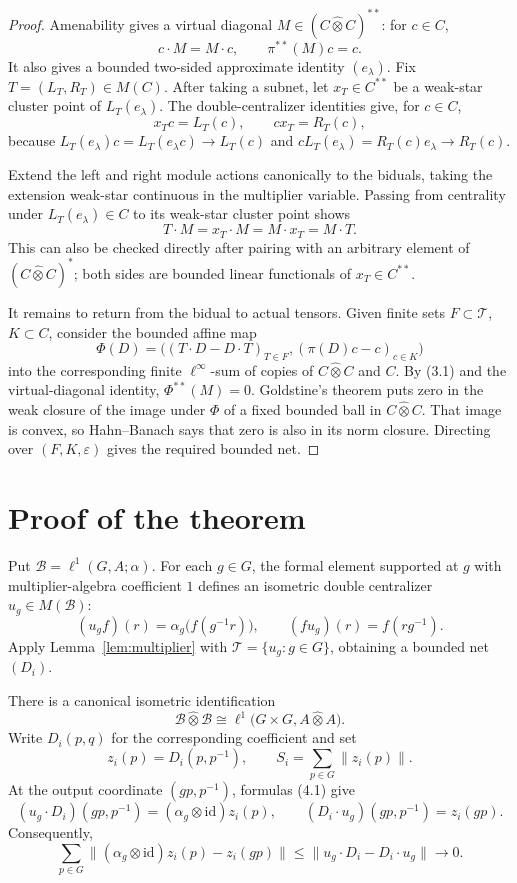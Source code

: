 \documentclass[11pt]{article}
\newcommand{\whot}{\widehat{\otimes}}
\newcommand{\ellone}{\ell^{1}}
\newcommand{\B}{\mathcal B}
\newcommand{\id}{\mathrm{id}}
\begin{document}
\begin{proof}
Amenability gives a virtual diagonal
\(M\in(C\whot C)^{**}\): for \(c\in C\),
\[
 c\cdot M=M\cdot c,
 \qquad \pi^{**}(M)c=c.
\]
It also gives a bounded two-sided approximate identity \((e_\lambda)\).
Fix \(T=(L_T,R_T)\in M(C)\).  After taking a subnet, let
\(x_T\in C^{**}\) be a weak-star cluster point of \(L_T(e_\lambda)\).
The double-centralizer identities give, for \(c\in C\),
\[
 x_Tc=L_T(c),
 \qquad cx_T=R_T(c),
\]
because
\(L_T(e_\lambda)c=L_T(e_\lambda c)\to L_T(c)\) and
\(cL_T(e_\lambda)=R_T(c)e_\lambda\to R_T(c)\).

Extend the left and right module actions canonically to the biduals, taking
the extension weak-star continuous in the multiplier variable.  Passing
from centrality under \(L_T(e_\lambda)\in C\) to its weak-star cluster
point shows
\[
 T\cdot M=x_T\cdot M=M\cdot x_T=M\cdot T.                 \tag{3.1}
\]
This can also be checked directly after pairing with an arbitrary element
of \((C\whot C)^*\); both sides are bounded linear functionals of
\(x_T\in C^{**}\).

It remains to return from the bidual to actual tensors.  Given finite sets
\(F\subset\mathcal T\), \(K\subset C\), consider the bounded affine map
\[
 \Phi(D)=\bigl((T\cdot D-D\cdot T)_{T\in F},
                  (\pi(D)c-c)_{c\in K}\bigr)
\]
into the corresponding finite \(\ell^\infty\)-sum of copies of
\(C\whot C\) and \(C\).  By (3.1) and the virtual-diagonal identity,
\(\Phi^{**}(M)=0\).  Goldstine's theorem puts zero in the weak closure of
the image under \(\Phi\) of a fixed bounded ball in \(C\whot C\).
That image is convex, so Hahn--Banach says that zero is also in its norm
closure.  Directing over \((F,K,\varepsilon)\) gives the required bounded
net.
\end{proof}

\section{Proof of the theorem}

Put \(\B=\ellone(G,A;\alpha)\).  For each \(g\in G\), the formal element
supported at \(g\) with multiplier-algebra coefficient \(1\) defines an
isometric double centralizer \(u_g\in M(\B)\):
\[
 (u_g f)(r)=\alpha_g\bigl(f(g^{-1}r)\bigr),
 \qquad (f u_g)(r)=f(rg^{-1}).                         \tag{4.1}
\]
Apply Lemma~\ref{lem:multiplier} with
\(\mathcal T=\{u_g:g\in G\}\), obtaining a bounded net \((D_i)\).

There is a canonical isometric identification
\[
 \B\whot\B
 \cong \ellone\bigl(G\times G,A\whot A\bigr).
\]
Write \(D_i(p,q)\) for the corresponding coefficient and set
\[
 z_i(p)=D_i(p,p^{-1}),
 \qquad S_i=\sum_{p\in G}\|z_i(p)\|.
\]
At the output coordinate \((gp,p^{-1})\), formulas (4.1) give
\[
 (u_g\cdot D_i)(gp,p^{-1})
     =(\alpha_g\otimes\id)z_i(p),
 \qquad
 (D_i\cdot u_g)(gp,p^{-1})=z_i(gp).
\]
Consequently,
\begin{equation}
 \sum_{p\in G}
 \bigl\|(\alpha_g\otimes\id)z_i(p)-z_i(gp)\bigr\|
 \le \|u_g\cdot D_i-D_i\cdot u_g\|\longrightarrow0. \tag{4.2}
\end{equation}
\end{document}
